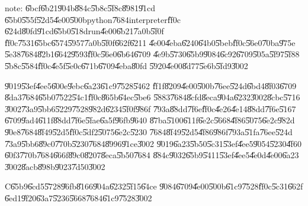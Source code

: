 note: \U{6bcf}\U{6b21}\U{904b}\U{884c}\U{5b8c}\U{5f8c}\U{8981}\U{91cd}%
\U{65b0}\U{555f}\U{52d5}\U{4e00}\U{500b}python\U{7684}interpreter\U{ff0c}%
\U{624d}\U{80fd}\U{91cd}\U{65b0}\U{518d}run\U{4e00}\U{6b21}\U{7a0b}\U{5f0f}%
\U{ff0c}\U{7531}\U{65bc}\U{6574}\U{5957}\U{7a0b}\U{5f0f}\U{662f}\U{6211}%
\U{4e00}\U{4eba}\U{6240}\U{64b0}\U{5beb}\U{ff0c}\U{56e0}\U{70ba}\U{975e}%
\U{5e38}\U{7684}\U{82b1}\U{6642}\U{9593}\U{ff0c}\U{56e0}\U{6b64}\U{6709}%
\U{4e9b}\U{5730}\U{65b9}\U{9084}\U{6c92}\U{6709}\U{505a}\U{5f97}\U{5f88}%
\U{5b8c}\U{5584}\U{ff0c}\U{4e5f}\U{5e0c}\U{671b}\U{6709}\U{4eba}\U{80fd}%
\U{5920}\U{4e00}\U{8d77}\U{5e6b}\U{5fd9}\U{3002}

\bigskip

\U{9019}\U{53ef}\U{4ee5}\U{600e}\U{9ebc}\U{6a23}\U{61c9}\U{7528}\U{5462}%
\U{ff1f}\U{8209}\U{4e00}\U{500b}\U{76ee}\U{524d}\U{6bd4}\U{8f03}\U{6709}%
\U{8da3}\U{7684}\U{65b0}\U{7522}\U{54c1}\U{ff0c}\U{865b}\U{64ec}\U{5be6}%
\U{5883}\U{7684}\U{8cfd}\U{8eca}\U{904a}\U{6232}\U{3002}\U{8cbc}\U{5716}%
\U{3002}\U{73a9}\U{5bb6}\U{5229}\U{7528}\U{982d}\U{6234}\U{5f0f}\U{986f}%
\U{793a}\U{88dd}\U{7f6e}\U{ff0c}\U{4e26}\U{4e14}\U{88dd}\U{7f6e}\U{5167}%
\U{6709}\U{9ad4}\U{611f}\U{88dd}\U{7f6e}\U{5fae}\U{6a5f}\U{96fb}\U{9640}%
\U{87ba}\U{5100}\U{611f}\U{6e2c}\U{5668}\U{4f86}\U{5075}\U{6e2c}\U{982d}%
\U{90e8}\U{7684}\U{8f49}\U{52d5}\U{ff0c}\U{5df2}\U{5075}\U{6e2c}\U{5230}%
\U{7684}\U{8f49}\U{52d5}\U{4f86}\U{986f}\U{793a}\U{51fa}\U{76ee}\U{524d}%
\U{73a9}\U{5bb6}\U{89c0}\U{770b}\U{5230}\U{7684}\U{8996}\U{91ce}\U{3002}%
\U{9019}\U{6a23}\U{5b50}\U{5c31}\U{53ef}\U{4ee5}\U{9054}\U{5230}\U{4f60}%
\U{60f3}\U{770b}\U{7684}\U{666f}\U{89c0}\U{8207}\U{8eca}\U{5b50}\U{7684}%
\U{884c}\U{9032}\U{65b9}\U{5411}\U{53ef}\U{4ee5}\U{4e0d}\U{4e00}\U{6a23}%
\U{3002}\U{8acb}\U{898b}\U{9023}\U{7d50}\U{3002}

\clearpage%

\begin{case}
C\U{65b9}\U{6cd5}\U{5728}\U{96fb}\U{8166}\U{904a}\U{6232}\U{5f15}\U{64ce}%
\U{9084}\U{6709}\U{4e00}\U{500b}\U{61c9}\U{7528}\U{ff0c}\U{5c31}\U{662f}%
\U{6ed1}\U{9f20}\U{63a7}\U{5236}\U{5668}\U{7684}\U{61c9}\U{7528}\U{3002}
\end{case}

